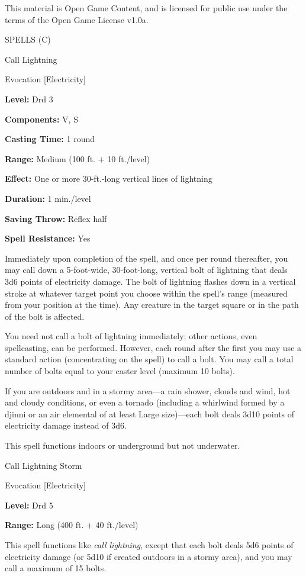 \documentclass{article}
\begin{document}
This material is Open Game Content, and is licensed for public use under the terms 
of the Open Game License v1.0a.

{\LARGE{}SPELLS (C)}

\vspace{12pt}
Call Lightning

Evocation [Electricity]

\textbf{Level:} Drd 3

\textbf{Components:} V, S

\textbf{Casting Time:} 1 round

\textbf{Range: }Medium (100 ft. + 10 ft./level)

\textbf{Effect:} One or more 30-ft.-long vertical lines of lightning

\textbf{Duration:} 1 min./level

\textbf{Saving Throw:} Reflex half

\textbf{Spell Resistance:} Yes

Immediately upon completion of the spell, and once per round thereafter, you may 
call down a 5-foot-wide, 30-foot-long, vertical bolt of lightning that deals 3d6 
points of electricity damage. The bolt of lightning flashes down in a vertical 
stroke at whatever target point you choose within the spell's range (measured from 
your position at the time). Any creature in the target square or in the path of 
the bolt is affected.

You need not call a bolt of lightning immediately; other actions, even spellcasting, 
can be performed. However, each round after the first you may use a standard action 
(concentrating on the spell) to call a bolt. You may call a total number of bolts 
equal to your caster level (maximum 10 bolts).

If you are outdoors and in a stormy area---a rain shower, clouds and wind, hot 
and cloudy conditions, or even a tornado (including a whirlwind formed by a djinni 
or an air elemental of at least Large size)---each bolt deals 3d10 points of electricity 
damage instead of 3d6.

This spell functions indoors or underground but not underwater.

\vspace{12pt}
Call Lightning Storm

Evocation [Electricity]

\textbf{Level:} Drd 5

\textbf{Range:} Long (400 ft. + 40 ft./level)

This spell functions like \textit{call lightning}, except that each bolt deals 
5d6 points of electricity damage (or 5d10 if created outdoors in a stormy area), 
and you may call a maximum of 15 bolts.
\end{document}
